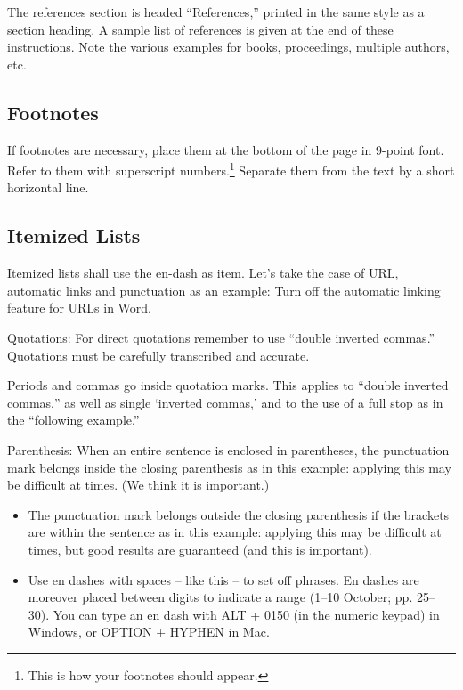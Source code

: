 \documentclass[letterpaper]{article}
\begin{document}
The references section is headed ``References,'' printed in the same style as a section heading. A sample list of references is given at the end of these instructions.  Note the various examples for books, proceedings, multiple authors, etc. 

\subsection{Footnotes}

If footnotes are necessary, place them at the bottom of the page in 9-point font. Refer to them with superscript numbers.\footnote{This is how your footnotes should appear.} Separate them from the text by a short horizontal line. 

\subsection{Itemized Lists}

Itemized lists shall use the en-dash as item. Let’s take the case of URL, automatic links and punctuation as an example:
Turn off the automatic linking feature for URLs in Word.

Quotations: For direct quotations remember to use ``double inverted commas.'' Quotations must be carefully transcribed and accurate. 

Periods and commas go inside quotation marks. This applies to ``double inverted commas,'' as well as single `inverted commas,' and to the use of a full stop as in the ``following example.'' 

Parenthesis: When an entire sentence is enclosed in parentheses, the punctuation mark belongs inside the closing parenthesis as in this example: applying this may be difficult at times. (We think it is important.)

\begin{itemize}
\item The punctuation mark belongs outside the closing parenthesis if the brackets are within the sentence as in this example: applying this may be difficult at times, but good results are guaranteed (and this is important).
\item Use en dashes with spaces -- like this -- to set off phrases. En dashes are moreover placed between digits to indicate a range (1--10 October; pp. 25--30). You can type an en dash with ALT + 0150 (in the numeric keypad) in Windows, or OPTION + HYPHEN in Mac.
\end{itemize}
\end{document}
